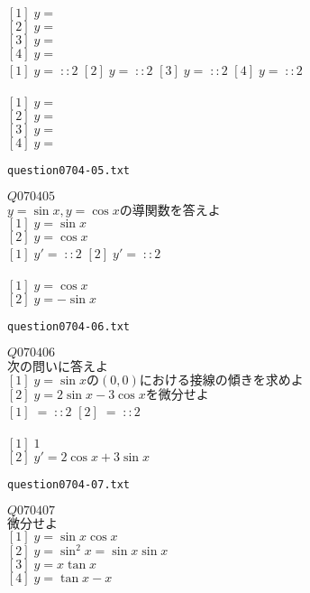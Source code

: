 \documentclass[10pt,dvipdfmx]{jarticle}
\begin{document}
$[1]\;y=$\\
$[2]\;y=$\\
$[3]\;y=$\\
$[4]\;y=$\\
$[1]\;y=\;::2$ 
$[2]\;y=\;::2$ 
$[3]\;y=\;::2$ 
$[4]\;y=\;::2$ 
\\
\\
$[1]\;y=$\\
$[2]\;y=$\\
$[3]\;y=$\\
$[4]\;y=$\\
\newpage
\begin{center}
\verb|question0704-05.txt|\\
\end{center}
$Q070405$\\
$y=\sin x ,y=\cos x \text{の導関数を答えよ}$\\
$[1]\;y=\sin x $\\
$[2]\;y=\cos x $\\
$[1]\;y'=\;::2$ 
$[2]\;y'=\;::2$ 
\\
\\
$[1]\;y=\cos x $\\
$[2]\;y=-\sin x $\\
\newpage
\begin{center}
\verb|question0704-06.txt|\\
\end{center}
$Q070406$\\
$\text{次の問いに答えよ}$\\
$[1]\;y=\sin x \text{の}(0,0)\text{における接線の傾きを求めよ}$\\
$[2]\;y=2\sin x -3\cos x \text{を微分せよ}$\\
$[1]\;=\;::2$ 
$[2]\;=\;::2$ 
\\
\\
$[1]\;1$\\
$[2]\;y'=2\cos x +3\sin x $\\
\newpage
\begin{center}
\verb|question0704-07.txt|\\
\end{center}
$Q070407$\\
$\text{微分せよ}$\\
$[1]\;y=\sin x \cos x $\\
$[2]\;y=\sin^{2}\! x =\sin x \sin x $\\
$[3]\;y=x\tan x $\\
$[4]\;y=\tan x -x$\\
\end{document}
